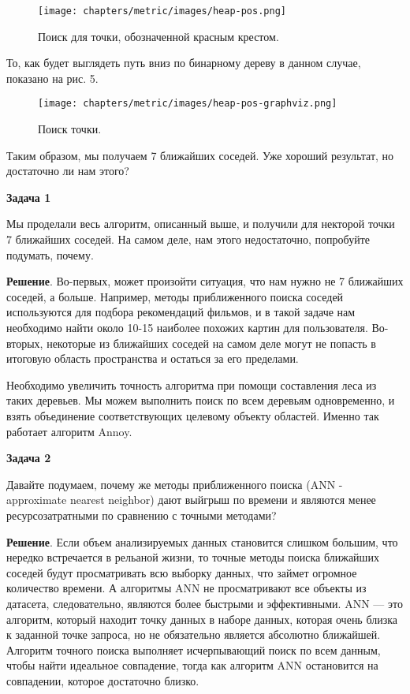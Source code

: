 \begin{figure}[h]
    \centering
    \texttt{[image: chapters/metric/images/heap-pos.png]}
    \caption{Поиск для точки, обозначенной красным крестом.}
    \label{fig:heap-pos}
\end{figure}

То, как будет выглядеть путь вниз по бинарному дереву в данном случае, показано на рис. 5. 

\begin{figure}[h]
    \centering
    \texttt{[image: chapters/metric/images/heap-pos-graphviz.png]}
    \caption{Поиск точки.}
    \label{fig:heap-pos-graph}
\end{figure}

Таким образом, мы получаем 7 ближайших соседей. Уже хороший результат, но достаточно ли нам этого?

\textbf{Задача 1}

Мы проделали весь алгоритм, описанный выше, и получили для некторой точки 7 ближайших соседей. На самом деле, нам этого недостаточно, попробуйте подумать, почему. 

\textbf{Решение}. Во-первых, может произойти ситуация, что нам нужно не 7 ближайших соседей, а больше.  Например, методы приближенного поиска соседей используются для подбора рекомендаций фильмов, и в такой задаче нам необходимо найти около 10-15 наиболее похожих картин для пользователя. 
Во-вторых, некоторые из ближайших соседей на самом деле могут не попасть в итоговую область пространства и остаться за его пределами. 

Необходимо увеличить точность алгоритма при помощи составления леса из таких деревьев. Мы можем выполнить поиск по всем деревьям одновременно, и взять объединение соответствующих целевому объекту областей. Именно так работает алгоритм Annoy. 

\textbf{Задача 2}

Давайте подумаем, почему же методы приближенного поиска (ANN - approximate nearest neighbor) дают выйгрыш по времени и являются менее ресурсозатратными по сравнению с точными методами?

\textbf{Решение}. Если объем анализируемых данных становится слишком большим, что нередко встречается в рельаной жизни, то точные методы поиска ближайших соседей будут просматривать всю выборку данных, что займет огромное количество времени. А алгоритмы ANN не просматривают все объекты из датасета, следовательно, являются более быстрыми и эффективными. ANN — это алгоритм, который находит точку данных в наборе данных, которая очень близка к заданной точке запроса, но не обязательно является абсолютно ближайшей. Алгоритм точного поиска выполняет исчерпывающий поиск по всем данным, чтобы найти идеальное совпадение, тогда как алгоритм ANN остановится на совпадении, которое достаточно близко.

